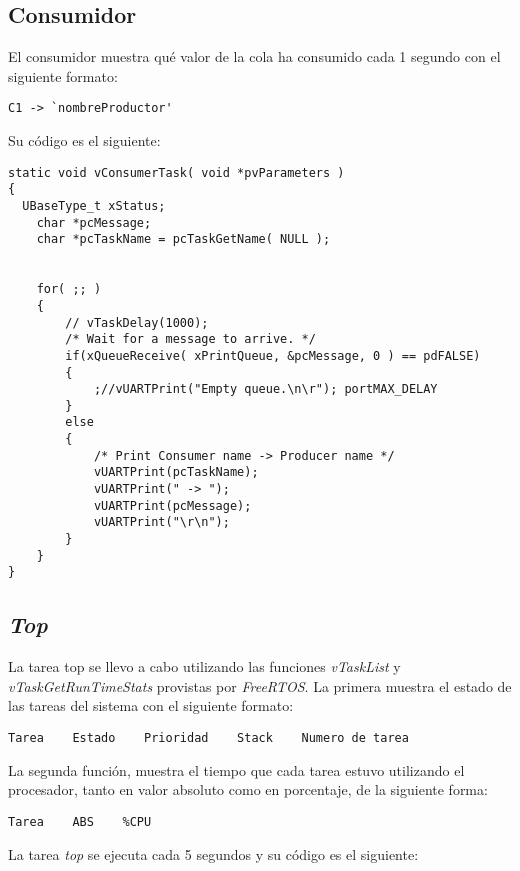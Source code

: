 \documentclass[12pt,a4paper]{article}
\begin{document}
\subsection{Consumidor}
\label{contask}
El consumidor muestra qué valor de la cola ha consumido cada 1 segundo con el
siguiente formato:

\begin{center}
\verb|C1 -> `nombreProductor'|
\end{center}

Su código es el siguiente:

\begin{lstlisting}[caption={Función `\emph{vConsumerTask}'.}, label={ctask}, language=Ce]
static void vConsumerTask( void *pvParameters )
{
  UBaseType_t xStatus;
	char *pcMessage;
	char *pcTaskName = pcTaskGetName( NULL );


	for( ;; )
	{
		// vTaskDelay(1000);
		/* Wait for a message to arrive. */
		if(xQueueReceive( xPrintQueue, &pcMessage, 0 ) == pdFALSE)
		{
			;//vUARTPrint("Empty queue.\n\r"); portMAX_DELAY
		}
		else
		{
			/* Print Consumer name -> Producer name */
			vUARTPrint(pcTaskName);
			vUARTPrint(" -> ");
			vUARTPrint(pcMessage);
			vUARTPrint("\r\n");
		}
	}
}
\end{lstlisting}

\subsection{\emph{Top}}
\label{totask}
La tarea top se llevo a cabo utilizando las funciones \emph{vTaskList} y
\emph{vTaskGetRunTimeStats} provistas por \emph{FreeRTOS}. La primera muestra
el estado de las tareas del sistema con el siguiente formato:

\begin{center}
\verb|Tarea    Estado    Prioridad    Stack    Numero de tarea|
\end{center}

La segunda función, muestra el tiempo que cada tarea estuvo utilizando el
procesador, tanto en valor absoluto como en porcentaje, de la siguiente forma:

\begin{center}
\verb|Tarea    ABS    %CPU|
\end{center}

La tarea \emph{top} se ejecuta cada 5 segundos y su código es el siguiente:
\end{document}
